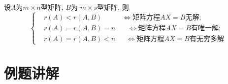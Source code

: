 \begin{thm}
设$A$为$m\times n$型矩阵, $B$为 $m\times s$型矩阵, 则
\begin{displaymath}\left\{\begin{aligned}
&r(A)<r(A,B)\ \ \ \ \ \ \ \ \ \ \ \ \ \Leftrightarrow \mbox{矩阵方程}AX=B\mbox{无解};\\
&r(A)=r(A,B)=n\ \ \ \ \ \ \ \ \Leftrightarrow \mbox{矩阵方程}AX=B\mbox{有唯一解};\\
&r(A)=r(A,B)<n\ \ \ \ \ \ \ \Leftrightarrow \mbox{矩阵方程}AX=B\mbox{有无穷多解}\end{aligned}\right.\end{displaymath}
\end{thm}


\section{例题讲解}

